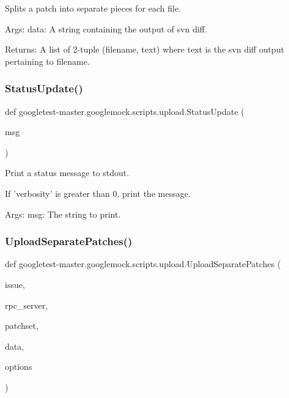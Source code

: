 \begin{DoxyVerb}Splits a patch into separate pieces for each file.

Args:
  data: A string containing the output of svn diff.

Returns:
  A list of 2-tuple (filename, text) where text is the svn diff output
    pertaining to filename.
\end{DoxyVerb}
 \mbox{\label{namespacegoogletest-master_1_1googlemock_1_1scripts_1_1upload_a06c407bee2581c8b821515280d54ef51}} 
\subsubsection{\texorpdfstring{StatusUpdate()}{StatusUpdate()}}
{\footnotesize\ttfamily def googletest-\/master.\+googlemock.\+scripts.\+upload.\+Status\+Update (\begin{DoxyParamCaption}\item[{}]{msg }\end{DoxyParamCaption})}

\begin{DoxyVerb}Print a status message to stdout.

If 'verbosity' is greater than 0, print the message.

Args:
  msg: The string to print.
\end{DoxyVerb}
 \mbox{\label{namespacegoogletest-master_1_1googlemock_1_1scripts_1_1upload_a09af80fd2ab4118212cfeaa3b3915cbf}} 
\subsubsection{\texorpdfstring{UploadSeparatePatches()}{UploadSeparatePatches()}}
{\footnotesize\ttfamily def googletest-\/master.\+googlemock.\+scripts.\+upload.\+Upload\+Separate\+Patches (\begin{DoxyParamCaption}\item[{}]{issue,  }\item[{}]{rpc\+\_\+server,  }\item[{}]{patchset,  }\item[{}]{data,  }\item[{}]{options }\end{DoxyParamCaption})}

